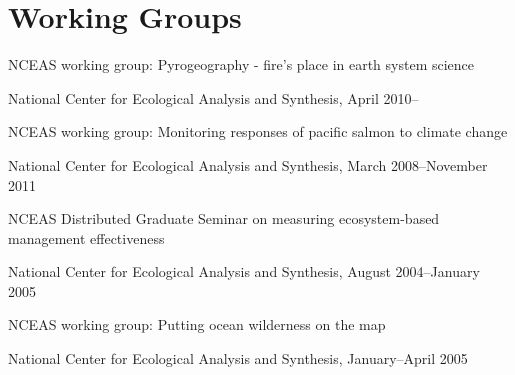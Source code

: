 \documentclass[letterpaper]{article}
\renewenvironment{itemize}{
  \begin{list}{}{
    \setlength{\leftmargin}{1.5em}
  }
}{
  \end{list}
}
\begin{document}
\section*{Working Groups}
\begin{itemize}
\item NCEAS working group: Pyrogeography - fire's place in earth system science
  \begin{itemize}
    \item National Center for Ecological Analysis and Synthesis, April 2010--
  \end{itemize}
\item NCEAS working group: Monitoring responses of pacific salmon to climate change
  \begin{itemize}
    \item National Center for Ecological Analysis and Synthesis, March 2008--November 2011
  \end{itemize}
\item NCEAS Distributed Graduate Seminar on measuring ecosystem-based management effectiveness
  \begin{itemize}
    \item National Center for Ecological Analysis and Synthesis, August 2004--January 2005
  \end{itemize}
\item NCEAS working group: Putting ocean wilderness on the map
  \begin{itemize}
    \item National Center for Ecological Analysis and Synthesis, January--April 2005
  \end{itemize}
\end{itemize}
\end{document}
